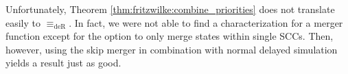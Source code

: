 Unfortunately, Theorem \ref{thm:fritzwilke:combine_priorities} does not translate easily to $\equiv_\text{deR}$. In fact, we were not able to find a characterization for a merger function except for the option to only merge states within single SCCs. Then, however, using the skip merger in combination with normal delayed simulation yields a result just as good.




















